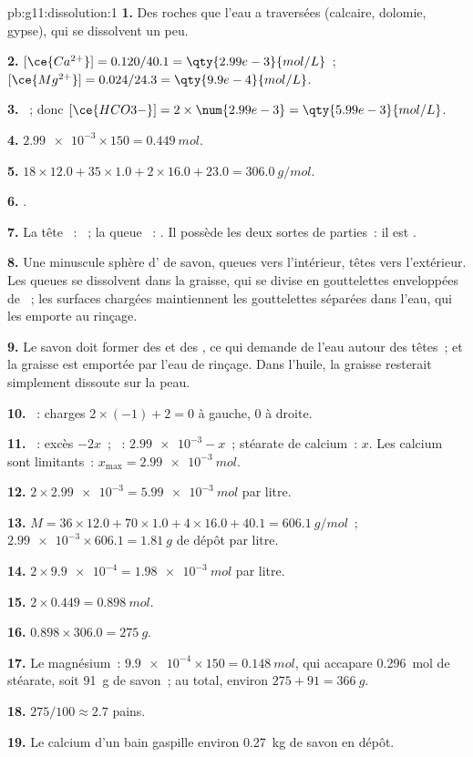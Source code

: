 \begin{solution}{pb:g11:dissolution:1}
\textbf{1.} Des roches que l'eau a traversées (calcaire, dolomie,
gypse), qui se dissolvent un peu.

\textbf{2.} $[\ce{Ca^{2+}}] = 0.120 / 40.1 = \qty{2.99e-3}{mol/L}$~;
$[\ce{Mg^{2+}}] = 0.024 / 24.3 = \qty{9.9e-4}{mol/L}$.

\textbf{3.} ~; donc
$[\ce{HCO3-}] = 2 \times \num{2.99e-3} = \qty{5.99e-3}{mol/L}$.

\textbf{4.} $\num{2.99e-3} \times 150 = \qty{0.449}{mol}$.

\textbf{5.} $18 \times 12.0 + 35 \times 1.0 + 2 \times 16.0 + 23.0 =
\qty{306.0}{g/mol}$.

\textbf{6.} .

\textbf{7.} La tête ~: ~; la queue ~:
. Il possède les deux sortes de parties~: il est .

\textbf{8.} Une minuscule sphère d' de savon, queues vers
l'intérieur, têtes vers l'extérieur. Les queues se dissolvent dans la
graisse, qui se divise en gouttelettes enveloppées de ~; les
surfaces chargées maintiennent les gouttelettes séparées dans l'eau, qui
les emporte au rinçage.

\textbf{9.} Le savon doit former des  et des , ce qui
demande de l'eau autour des têtes~; et la graisse est emportée par l'eau
de rinçage. Dans l'huile, la graisse resterait simplement dissoute sur
la peau.

\textbf{10.} ~: charges
$2 \times (-1) + 2 = 0$ à gauche, $0$ à droite.

\textbf{11.} ~: excès $- 2x$~; ~:
$\num{2.99e-3} - x$~; stéarate de calcium~: $x$. Les  calcium sont
limitants~: $x_{\max} = \qty{2.99e-3}{mol}$.

\textbf{12.} $2 \times \num{2.99e-3} = \qty{5.99e-3}{mol}$ par litre.

\textbf{13.} $M = 36 \times 12.0 + 70 \times 1.0 + 4 \times 16.0 + 40.1 =
\qty{606.1}{g/mol}$~; $\num{2.99e-3} \times 606.1 = \qty{1.81}{g}$ de
dépôt par litre.

\textbf{14.} $2 \times \num{9.9e-4} = \qty{1.98e-3}{mol}$ par litre.

\textbf{15.} $2 \times 0.449 = \qty{0.898}{mol}$.

\textbf{16.} $0.898 \times 306.0 = \qty{275}{g}$.

\textbf{17.} Le magnésium~: $\num{9.9e-4} \times 150 = \qty{0.148}{mol}$,
qui accapare \qty{0.296}{mol} de stéarate, soit \qty{91}{g} de savon~; au
total, environ $275 + 91 = \qty{366}{g}$.

\textbf{18.} $275 / 100 \approx 2.7$ pains.

\textbf{19.} Le calcium d'un bain gaspille environ \qty{0.27}{kg} de
savon en dépôt.
\end{solution}
